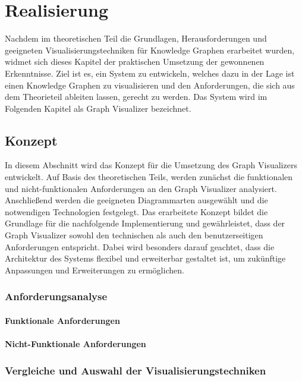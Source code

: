 
\chapter{Realisierung}

Nachdem im theoretischen Teil die Grundlagen, Herausforderungen und geeigneten Visualisierungstechniken für Knowledge Graphen erarbeitet wurden, widmet sich dieses Kapitel der praktischen Umsetzung der gewonnenen Erkenntnisse. Ziel ist es, ein System zu entwickeln, welches dazu in der Lage ist einen Knowledge Graphen zu visualisieren und den Anforderungen, die sich aus dem Theorieteil ableiten lassen, gerecht zu werden. Das System wird im Folgenden Kapitel als Graph Visualizer bezeichnet.

\section{Konzept}

In diesem Abschnitt wird das Konzept für die Umsetzung des Graph Visualizers entwickelt. Auf Basis des theoretischen Teils, werden zunächst die funktionalen und nicht-funktionalen Anforderungen an den Graph Visualizer analysiert. Anschließend werden die geeigneten Diagrammarten ausgewählt und die notwendigen Technologien festgelegt. Das erarbeitete Konzept bildet die Grundlage für die nachfolgende Implementierung und gewährleistet, dass der Graph Visualizer sowohl den technischen als auch den benutzerseitigen Anforderungen entspricht. Dabei wird besonders darauf geachtet, dass die Architektur des Systems flexibel und erweiterbar gestaltet ist, um zukünftige Anpassungen und Erweiterungen zu ermöglichen.

\subsection{Anforderungsanalyse}
\subsubsection{Funktionale Anforderungen}
\subsubsection{Nicht-Funktionale Anforderungen}

\subsection{Vergleiche und Auswahl der Visualisierungstechniken}

